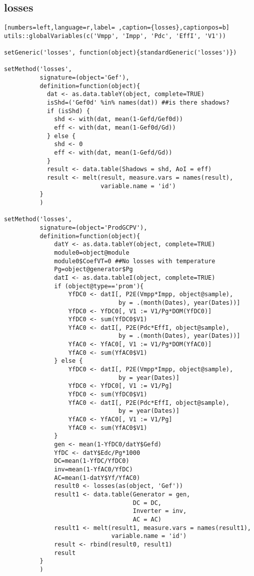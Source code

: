 \subsection{losses}
\label{sec:org73b371f}
\label{subsec:losses}
\begin{lstlisting}[numbers=left,language=r,label= ,caption={losses},captionpos=b]
utils::globalVariables(c('Vmpp', 'Impp', 'Pdc', 'EffI', 'V1'))

setGeneric('losses', function(object){standardGeneric('losses')})

setMethod('losses',
          signature=(object='Gef'),
          definition=function(object){
            dat <- as.data.tableY(object, complete=TRUE)
            isShd=('Gef0d' %in% names(dat)) ##is there shadows?
            if (isShd) {
              shd <- with(dat, mean(1-Gefd/Gef0d))
              eff <- with(dat, mean(1-Gef0d/Gd))
            } else {
              shd <- 0
              eff <- with(dat, mean(1-Gefd/Gd))
            }
            result <- data.table(Shadows = shd, AoI = eff)
            result <- melt(result, measure.vars = names(result),
                           variable.name = 'id')
          }
          )

setMethod('losses',
          signature=(object='ProdGCPV'),
          definition=function(object){
              datY <- as.data.tableY(object, complete=TRUE)
              module0=object@module
              module0$CoefVT=0 ##No losses with temperature
              Pg=object@generator$Pg
              datI <- as.data.tableI(object, complete=TRUE)
              if (object@type=='prom'){
                  YfDC0 <- datI[, P2E(Vmpp*Impp, object@sample),
                                by = .(month(Dates), year(Dates))]
                  YfDC0 <- YfDC0[, V1 := V1/Pg*DOM(YfDC0)]
                  YfDC0 <- sum(YfDC0$V1)
                  YfAC0 <- datI[, P2E(Pdc*EffI, object@sample),
                                by = .(month(Dates), year(Dates))]
                  YfAC0 <- YfAC0[, V1 := V1/Pg*DOM(YfAC0)]
                  YfAC0 <- sum(YfAC0$V1)
              } else {
                  YfDC0 <- datI[, P2E(Vmpp*Impp, object@sample),
                                by = year(Dates)]
                  YfDC0 <- YfDC0[, V1 := V1/Pg]
                  YfDC0 <- sum(YfDC0$V1)
                  YfAC0 <- datI[, P2E(Pdc*EffI, object@sample),
                                by = year(Dates)]
                  YfAC0 <- YfAC0[, V1 := V1/Pg]
                  YfAC0 <- sum(YfAC0$V1)
              }
              gen <- mean(1-YfDC0/datY$Gefd)
              YfDC <- datY$Edc/Pg*1000
              DC=mean(1-YfDC/YfDC0)
              inv=mean(1-YfAC0/YfDC)
              AC=mean(1-datY$Yf/YfAC0)
              result0 <- losses(as(object, 'Gef'))
              result1 <- data.table(Generator = gen,
                                    DC = DC,
                                    Inverter = inv,
                                    AC = AC)
              result1 <- melt(result1, measure.vars = names(result1),
                              variable.name = 'id')
              result <- rbind(result0, result1)
              result
          }
          )


\end{lstlisting}
